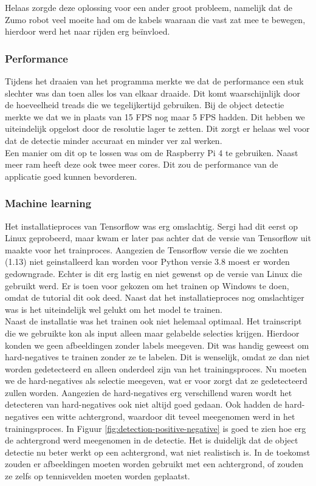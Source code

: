 Helaas zorgde deze oplossing voor een ander groot probleem, namelijk dat de Zumo robot veel moeite had om de kabels waaraan die vast zat mee te bewegen, hierdoor werd het naar rijden erg beïnvloed.

\subsubsection*{Performance}

Tijdens het draaien van het programma merkte we dat de performance een stuk slechter was dan toen alles los van elkaar draaide. Dit komt waarschijnlijk door de hoeveelheid treads die we tegelijkertijd gebruiken. Bij de object detectie merkte we dat we in plaats van 15 FPS nog maar 5 FPS hadden. Dit hebben we uiteindelijk opgelost door de resolutie lager te zetten. Dit zorgt er helaas wel voor dat de detectie minder accuraat en minder ver zal werken.\\

Een manier om dit op te lossen was om de Raspberry Pi 4 te gebruiken. Naast meer ram heeft deze ook twee meer cores. Dit zou de performance van de applicatie goed kunnen bevorderen.

\subsubsection*{Machine learning}

Het installatieproces van Tensorflow was erg omslachtig. Sergi had dit eerst op Linux geprobeerd, maar kwam er later pas achter dat de versie van Tensorflow uit maakte voor het trainproces. Aangezien de Tensorflow versie die we zochten (1.13) niet geinstalleerd kan worden voor Python versie 3.8 moest er worden gedowngrade. Echter is dit erg lastig en niet gewenst op de versie van Linux die gebruikt werd. Er is toen voor gekozen om het trainen op Windows te doen, omdat de tutorial dit ook deed. Naast dat het installatieproces nog omslachtiger was is het uiteindelijk wel gelukt om het model te trainen.\\

Naast de installatie was het trainen ook niet helemaal optimaal. Het trainscript die we gebruikte kon als input alleen maar gelabelde selecties krijgen. Hierdoor konden we geen afbeeldingen zonder labels meegeven. Dit was handig geweest om hard-negatives te trainen zonder ze te labelen. Dit is wenselijk, omdat ze dan niet worden gedetecteerd en alleen onderdeel zijn van het trainingsproces. Nu moeten we de hard-negatives als selectie meegeven, wat er voor zorgt dat ze gedetecteerd zullen worden. Aangezien de hard-negatives erg verschillend waren wordt het detecteren van hard-negatives ook niet altijd goed gedaan. Ook hadden de hard-negatives een witte achtergrond, waardoor dit teveel meegenomen werd in het trainingsproces. In Figuur \ref{fig:detection-positive-negative} is goed te zien hoe erg de achtergrond werd meegenomen in de detectie. Het is duidelijk dat de object detectie nu beter werkt op een achtergrond, wat niet realistisch is. In de toekomst zouden er afbeeldingen moeten worden gebruikt met een achtergrond, of zouden ze zelfs op tennisvelden moeten worden geplaatst. 

